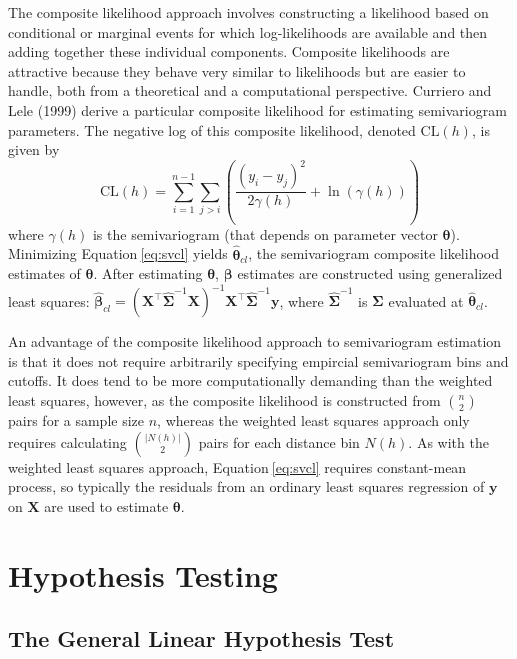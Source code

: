 \documentclass{article}
\begin{document}
The composite likelihood approach involves constructing a likelihood
based on conditional or marginal events for which log-likelihoods are
available and then adding together these individual components.
Composite likelihoods are attractive because they behave very similar to
likelihoods but are easier to handle, both from a theoretical and a
computational perspective. Curriero and Lele (1999) derive a particular
composite likelihood for estimating semivariogram parameters. The
negative log of this composite likelihood, denoted \(\text{CL}(h)\), is
given by \begin{equation}\label{eq:svcl}
  \text{CL}(h) = \sum_{i = 1}^{n - 1} \sum_{j > i} \left( \frac{(y_i - y_j)^2}{2\gamma(h)} + \ln(\gamma(h)) \right)
\end{equation} where \(\gamma(h)\) is the semivariogram (that depends on
parameter vector \(\bm{\theta}\)). Minimizing Equation\(~\)\ref{eq:svcl}
yields \(\bm{\hat{\theta}}_{cl}\), the semivariogram composite
likelihood estimates of \(\bm{\theta}\). After estimating
\(\bm{\theta}\), \(\bm{\beta}\) estimates are constructed using
generalized least squares:
\(\bm{\hat{\beta}}_{cl} = (\mathbf{X}^\intercal \hat{\mathbf{\Sigma}}^{-1} \mathbf{X})^{-1} \mathbf{X}^\intercal \hat{\mathbf{\Sigma}}^{-1} \mathbf{y}\),
where \(\hat{\mathbf{\Sigma}}^{-1}\) is \(\mathbf{\Sigma}\) evaluated at
\(\bm{\hat{\theta}}_{cl}\).

An advantage of the composite likelihood approach to semivariogram
estimation is that it does not require arbitrarily specifying empircial
semivariogram bins and cutoffs. It does tend to be more computationally
demanding than the weighted least squares, however, as the composite
likelihood is constructed from \(\binom{n}{2}\) pairs for a sample size
\(n\), whereas the weighted least squares approach only requires
calculating \(\binom{|N(h)|}{2}\) pairs for each distance bin \(N(h)\).
As with the weighted least squares approach, Equation\(~\)\ref{eq:svcl}
requires constant-mean process, so typically the residuals from an
ordinary least squares regression of \(\mathbf{y}\) on \(\mathbf{X}\)
are used to estimate \(\bm{\theta}\).

\hypertarget{hypothesis-testing}{%
\section{Hypothesis Testing}\label{hypothesis-testing}}

\hypertarget{the-general-linear-hypothesis-test}{%
\subsection{The General Linear Hypothesis
Test}\label{the-general-linear-hypothesis-test}}
\end{document}
